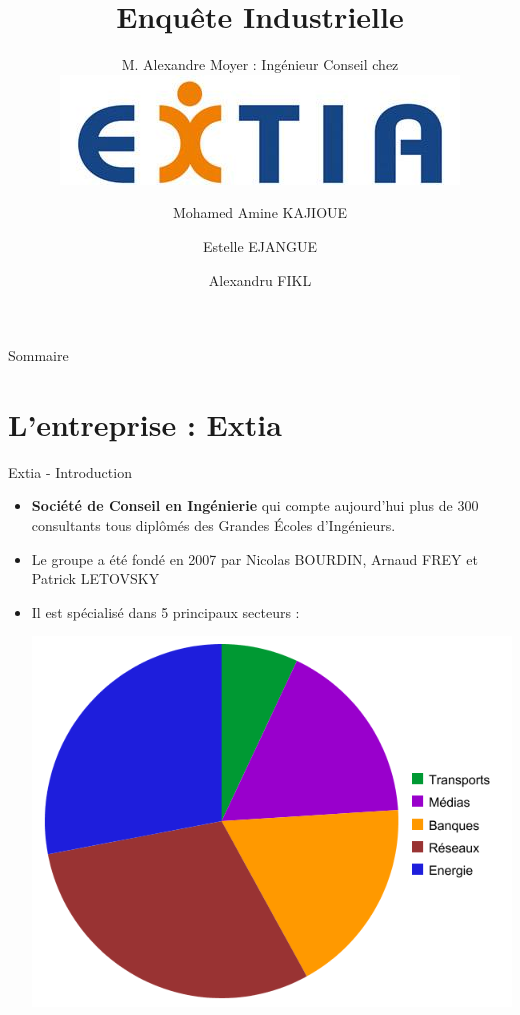\documentclass[xcolor=dvipsnames]{beamer}
\title[Enquête Industrielle]{Enquête Industrielle}
\subtitle{M. Alexandre Moyer : Ing\'enieur Conseil chez \includegraphics[scale=0.11]{img/logo_extia.jpg}}
\author[M. Kajioue, E. Ejangue, A. Fikl]{Mohamed Amine KAJIOUE \and Estelle EJANGUE \and Alexandru FIKL}
\begin{document}
\begin{frame}
	\maketitle
\end{frame}

\begin{frame}{Sommaire}
	\tableofcontents
\end{frame}

\section{L'entreprise : Extia}
\begin{frame}{Extia - Introduction}
\begin{itemize}[<+-| alert@+>]
    \item \textbf{Société de Conseil en Ingénierie} qui compte aujourd'hui plus de
300 consultants tous diplômés des Grandes Écoles d'Ingénieurs.
    \item Le groupe a été fond\'e en 2007 par Nicolas BOURDIN, Arnaud FREY et Patrick LETOVSKY
	\item Il est spécialisé dans 5 principaux secteurs :
	\begin{center}
	    \includegraphics[scale=0.25]{img/extia_sectors.png}
	\end{center}
\end{itemize}
\end{frame}
\end{document}
